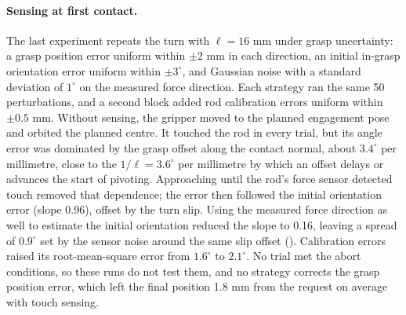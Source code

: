 \paragraph{Sensing at first contact.}
The last experiment repeats the turn with $\ell=16$ mm under grasp uncertainty: a grasp position error uniform within $\pm2$ mm in each direction, an initial in-grasp orientation error uniform within $\pm3^{\circ}$, and Gaussian noise with a standard deviation of $1^{\circ}$ on the measured force direction. Each strategy ran the same 50 perturbations, and a second block added rod calibration errors uniform within $\pm0.5$ mm. Without sensing, the gripper moved to the planned engagement pose and orbited the planned centre. It touched the rod in every trial, but its angle error was dominated by the grasp offset along the contact normal, about $3.4^{\circ}$ per millimetre, close to the $1/\ell=3.6^{\circ}$ per millimetre by which an offset delays or advances the start of pivoting. Approaching until the rod's force sensor detected touch removed that dependence; the error then followed the initial orientation error (slope 0.96), offset by the turn slip. Using the measured force direction as well to estimate the initial orientation reduced the slope to 0.16, leaving a spread of $0.9^{\circ}$ set by the sensor noise around the same slip offset (). Calibration errors raised its root-mean-square error from $1.6^{\circ}$ to $2.1^{\circ}$. No trial met the abort conditions, so these runs do not test them, and no strategy corrects the grasp position error, which left the final position 1.8 mm from the request on average with touch sensing.


